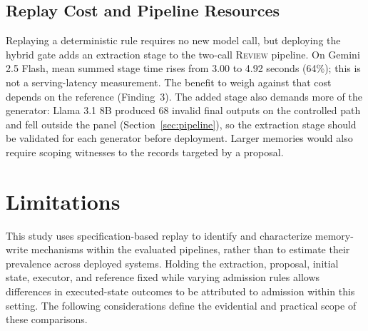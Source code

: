 \documentclass[acmsmall,review,anonymous]{acmart}
\newcommand{\review}{\textsc{Review}}
\begin{document}
\subsection{Replay Cost and Pipeline Resources}
Replaying a deterministic rule requires no new model call, but deploying the hybrid gate adds an extraction stage to the two-call \review{} pipeline. On Gemini 2.5 Flash, mean summed stage time rises from 3.00 to 4.92 seconds (64\%); this is not a serving-latency measurement. The benefit to weigh against that cost depends on the reference (Finding~3). The added stage also demands more of the generator: Llama 3.1 8B produced 68 invalid final outputs on the controlled path and fell outside the panel (Section~\ref{sec:pipeline}), so the extraction stage should be validated for each generator before deployment. Larger memories would also require scoping witnesses to the records targeted by a proposal.

\section{Limitations}\label{sec:limitations}
This study uses specification-based replay to identify and characterize memory-write mechanisms within the evaluated pipelines, rather than to estimate their prevalence across deployed systems. Holding the extraction, proposal, initial state, executor, and reference fixed while varying admission rules allows differences in executed-state outcomes to be attributed to admission within this setting. The following considerations define the evidential and practical scope of these comparisons.
\end{document}
